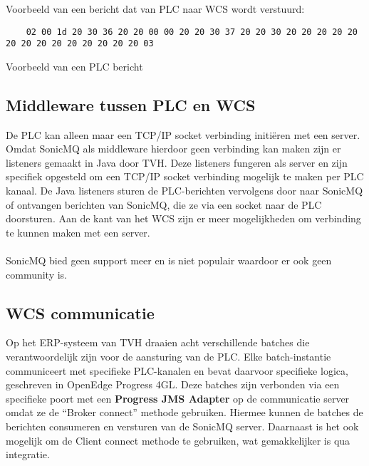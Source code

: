 Voorbeeld van een bericht dat van PLC naar WCS wordt verstuurd: 
\begin{listing}[h!]
  \begin{verbatim}
    02 00 1d 20 30 36 20 20 00 00 20 20 30 37 20 20 30 20 20 20 20 20 20 20 20 20 20 20 20 20 20 03
  \end{verbatim}
  \caption[Voorbeeld PLC bericht]{Voorbeeld van een PLC bericht}
\end{listing}

\subsection{Middleware tussen PLC en WCS}
De PLC kan alleen maar een TCP/IP socket verbinding initiëren met een server.
Omdat SonicMQ als middleware hierdoor geen verbinding kan maken zijn er listeners gemaakt in Java door TVH.
Deze listeners fungeren als server en zijn specifiek opgesteld om een TCP/IP socket verbinding mogelijk te maken per PLC kanaal.
De Java listeners sturen de PLC-berichten vervolgens door naar SonicMQ of ontvangen berichten van SonicMQ, 
die ze via een socket naar de PLC doorsturen.
Aan de kant van het WCS zijn er meer mogelijkheden om verbinding te kunnen maken met een server.
\\\\
SonicMQ bied geen support meer en is niet populair waardoor er ook geen community is.
 
\subsection{WCS communicatie} 
Op het ERP-systeem van TVH draaien acht verschillende batches die verantwoordelijk zijn voor de aansturing van de PLC. 
Elke batch-instantie communiceert met specifieke PLC-kanalen en bevat daarvoor specifieke logica, geschreven in OpenEdge Progress 4GL.
Deze batches zijn verbonden via een specifieke poort met een \textbf{Progress JMS Adapter} op de communicatie server omdat ze de ``Broker connect'' methode gebruiken.
Hiermee kunnen de batches de berichten consumeren en versturen van de SonicMQ server.
Daarnaast is het ook mogelijk om de Client connect methode te gebruiken, wat gemakkelijker is qua integratie.

